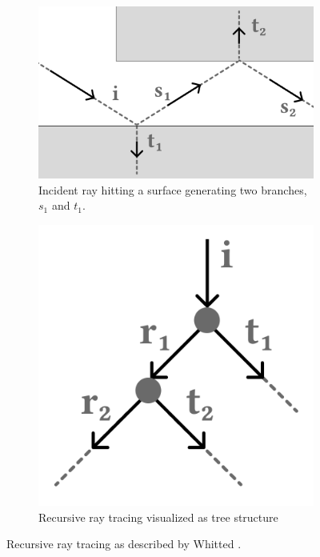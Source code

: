\begin{figure}[H]
  \centering
  \begin{subfigure}[b]{0.45\textwidth}
      \includegraphics[width=\textwidth]{resources/recursive-ray-tracing-visualized.png}
      \caption{Incident ray hitting a surface generating two branches, $s_1$ and $t_1$.}
      \label{fig:recursiveVisualized}
  \end{subfigure}
  \hfill
  \begin{subfigure}[b]{0.3\textwidth}
    \includegraphics[width=\textwidth]{resources/recursive-ray-tracing-tree.png}
    \caption{Recursive ray tracing visualized as tree structure}
    \label{fig:recursiveTree}
  \end{subfigure}
  \caption{Recursive ray tracing as described by Whitted \cite{whittedGlobalIllumination}.}
  \label{fig:recursiveRayTracing}
\end{figure}

